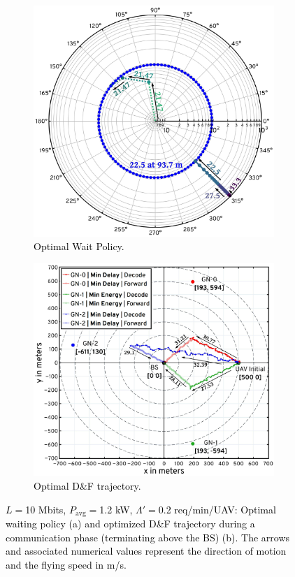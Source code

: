 \documentclass[10pt, twocolumn]{IEEEtran}
\theoremstyle{plain}
\theoremstyle{definition}
\theoremstyle{remark}
\newcommand\hlt[1]{\textcolor{black}{#1}}
\begin{document}
\begin{figure} [t]
    \begin{subfigure}{0.485\linewidth}
      \centering
      \includegraphics[width=1.0\linewidth]{figs/Waiting_Policy_10Mb.jpeg}
      \caption{\hlt{Optimal Wait Policy.}}
      \label{F6}
    \end{subfigure}
    \hfill
    \begin{subfigure}{0.515\linewidth}
      \centering
      \includegraphics[width=1.0\linewidth]{figs/HCSO_Trajectories_Updated.jpeg}
      \caption{\hlt{Optimal D\&F trajectory.}}
      \label{F7}
    \end{subfigure}
    \caption{\hlt{$L{=}$10 Mbits, $P_{\mathrm{avg}}{=}$1.2 kW,
    $\Lambda'{=}$0.2 req/min/UAV: Optimal waiting policy (a) and optimized D\&F trajectory during a communication phase 
    (terminating above the BS) (b).
    The arrows and associated numerical values represent the direction of motion and the flying speed in m/s.}}
    \vspace{-6mm}
    \label{Fig4}
\end{figure}
\end{document}
